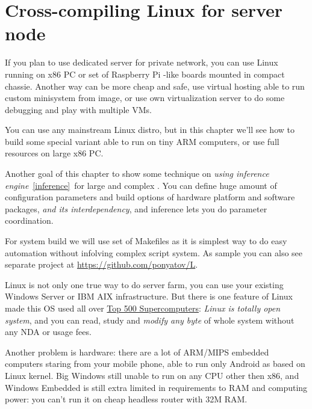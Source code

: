 \chapter{Cross-compiling Linux for server node}\label{cross}\clearpage

\noindent
If you plan to use dedicated server for private
network, you can use Linux running on x86 PC or set of Raspberry Pi -like boards
mounted in compact chassie. Another way can be more cheap and safe, use virtual
hosting able to run custom minisystem from image, or use own virtualization
server to do some debugging and play with multiple VMs.

You can use any mainstream Linux distro, but
in this chapter we'll see how to build some special 
variant able to run on tiny ARM computers, or use full resources on large x86
PC.

Another goal of this chapter to show some technique on \emph{using inference
engine}\ \ref{inference}\ for large and complex . You can define huge amount of configuration parameters and build
options of hardware platform and software packages, \emph{and its
interdependency}, and inference lets you do parameter coordination.

For system build we will use set of Makefiles as it is simplest way to do easy
automation without infolving complex script system. As sample you can also see
separate project at \url{https://github.com/ponyatov/L}.

Linux is not only one true way to do server farm, you can use your existing
Windows Server or IBM AIX infrastructure. But there is one feature of Linux made
this OS used all over
\href{https://www.top500.org/statistics/details/osfam/1}{Top 500
Supercomputers}: \emph{Linux is totally open system}, and you can read, study
and \emph{modify any byte} of whole system without any NDA or usage fees.

Another problem is hardware: there are a lot of ARM/MIPS embedded computers
staring from your mobile phone, able to run only Android as based on Linux
kernel. Big Windows still unable to run on any CPU other then x86, and Windows Embedded is still extra limited in requirements to RAM
and computing power: you can't run it on cheap headless router with 32M RAM.

\clearpage
{}%

